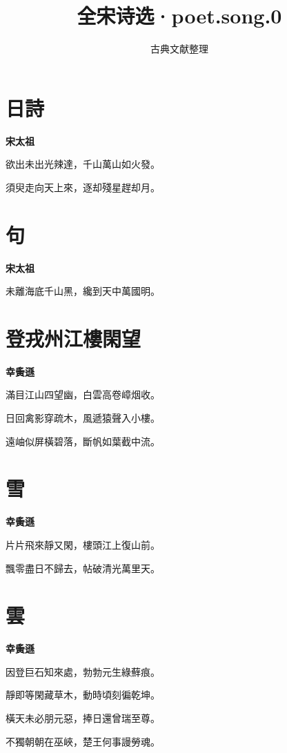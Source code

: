 \documentclass[12pt,a4paper]{ctexbook}
\title{全宋诗选·poet.song.0}
\author{古典文献整理}
\date{}
\begin{document}
\maketitle
\tableofcontents
\newpage
\section{日詩}
\textbf{宋太祖}\par\vspace{0.5em}
欲出未出光辣達，千山萬山如火發。\par
須臾走向天上來，逐却殘星趕却月。\par

\section{句}
\textbf{宋太祖}\par\vspace{0.5em}
未離海底千山黑，纔到天中萬國明。\par

\section{登戎州江樓閑望}
\textbf{幸夤遜}\par\vspace{0.5em}
滿目江山四望幽，白雲高卷嶂烟收。\par
日回禽影穿疏木，風遞猿聲入小樓。\par
遠岫似屏橫碧落，斷帆如葉截中流。\par

\section{雪}
\textbf{幸夤遜}\par\vspace{0.5em}
片片飛來靜又閑，樓頭江上復山前。\par
飄零盡日不歸去，帖破清光萬里天。\par

\section{雲}
\textbf{幸夤遜}\par\vspace{0.5em}
因登巨石知來處，勃勃元生綠蘚痕。\par
靜即等閑藏草木，動時頃刻徧乾坤。\par
橫天未必朋元惡，捧日還曾瑞至尊。\par
不獨朝朝在巫峽，楚王何事謾勞魂。\par
\end{document}
